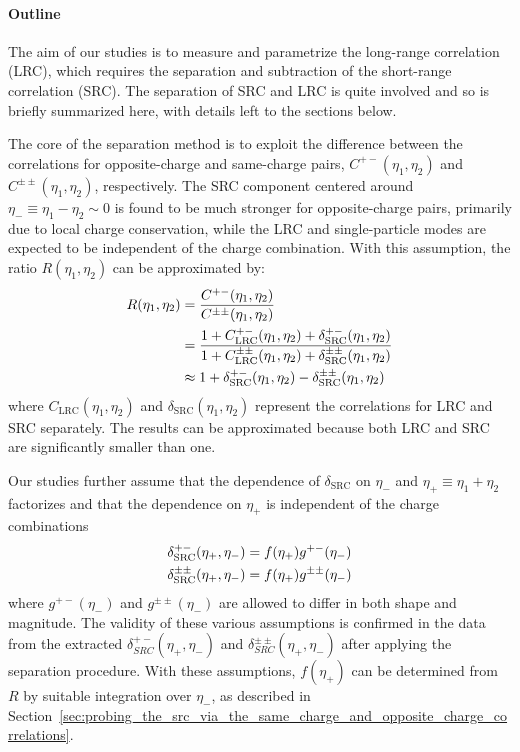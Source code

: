 \paragraph{Outline}

The aim of our studies is to measure and parametrize the long-range correlation (LRC), which requires the separation and subtraction of the short-range correlation (SRC). The separation of SRC and LRC is quite involved and so is briefly summarized here, with details left to the sections below.

The core of the separation method is to exploit the difference between the correlations for opposite-charge and same-charge pairs, $C^{+-}(\eta_1, \eta_2)$ and $C^{\pm\pm}(\eta_1, \eta_2)$, respectively. The SRC component centered around $\eta_- \equiv \eta_1 - \eta_2 \sim 0$ is found to be much stronger for opposite-charge pairs, primarily due to local charge conservation, while the LRC and single-particle modes are expected to be independent of the charge combination. With this assumption, the ratio $R(\eta_1, \eta_2)$ can be approximated by:
\begin{equation}
\begin{split}
R(\eta_1, \eta_2) &= \frac{C^{+-}(\eta_1, \eta_2)}{C^{\pm\pm}(\eta_1, \eta_2)} \\
&= \frac{1 + C_\text{LRC}^{+-}(\eta_1, \eta_2) + \delta_\text{SRC}^{+-}(\eta_1, \eta_2)}{1 + C_\text{LRC}^{\pm\pm}(\eta_1, \eta_2) + \delta_\text{SRC}^{\pm\pm}(\eta_1, \eta_2)} \\
&\approx 1 + \delta_\text{SRC}^{+-}(\eta_1, \eta_2) - \delta_\text{SRC}^{\pm\pm}(\eta_1, \eta_2)
\end{split}
\end{equation}
where $C_\text{LRC}(\eta_1, \eta_2)$ and $\delta_\text{SRC}(\eta_1, \eta_2)$ represent the correlations for LRC and SRC separately. The results can be approximated because both LRC and SRC are significantly smaller than one.

Our studies further assume that the dependence of $\delta_\text{SRC}$ on $\eta_-$ and $\eta_+ \equiv \eta_1 + \eta_2$ factorizes and that the dependence on $\eta_+$ is independent of the charge combinations
\begin{equation}
\begin{split}
\delta_\text{SRC}^{+-}(\eta_+, \eta_-) &= f(\eta_+)g^{+-}(\eta_-) \\
\delta_\text{SRC}^{\pm\pm}(\eta_+, \eta_-) &= f(\eta_+) g^{\pm\pm}(\eta_-)
\end{split}
\end{equation}
where $g^{+-}(\eta_-)$ and $g^{\pm\pm}(\eta_-)$ are allowed to differ in both shape and magnitude. The validity of these various assumptions is confirmed in the data from the extracted $\delta_{SRC}^{+-}(\eta_+, \eta_-)$ and $\delta_{SRC}^{\pm\pm}(\eta_+, \eta_-)$ after applying the separation procedure. With these assumptions, $f(\eta_+)$ can be determined from $R$ by suitable integration over $\eta_-$, as described in Section~\ref{sec:probing_the_src_via_the_same_charge_and_opposite_charge_correlations}.

